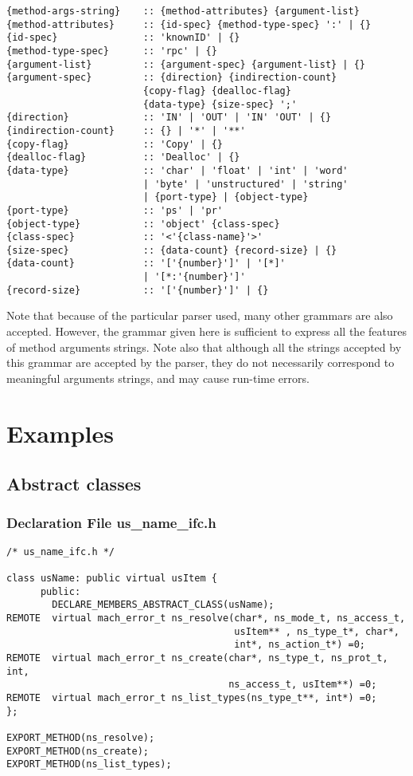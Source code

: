 \begin{verbatim}
{method-args-string}    :: {method-attributes} {argument-list}
{method-attributes}     :: {id-spec} {method-type-spec} ':' | {}
{id-spec}               :: 'knownID' | {}
{method-type-spec}      :: 'rpc' | {}
{argument-list}         :: {argument-spec} {argument-list} | {}
{argument-spec}         :: {direction} {indirection-count}
                        {copy-flag} {dealloc-flag}
                        {data-type} {size-spec} ';'
{direction}             :: 'IN' | 'OUT' | 'IN' 'OUT' | {}
{indirection-count}     :: {} | '*' | '**'
{copy-flag}             :: 'Copy' | {}
{dealloc-flag}          :: 'Dealloc' | {}
{data-type}             :: 'char' | 'float' | 'int' | 'word'
                        | 'byte' | 'unstructured' | 'string'
                        | {port-type} | {object-type}
{port-type}             :: 'ps' | 'pr'
{object-type}           :: 'object' {class-spec}
{class-spec}            :: '<'{class-name}'>'
{size-spec}             :: {data-count} {record-size} | {}
{data-count}            :: '['{number}']' | '[*]'
                        | '[*:'{number}']'
{record-size}           :: '['{number}']' | {}
\end{verbatim}

Note that because of the particular parser used, many other grammars
are also accepted. However, the grammar given here is sufficient to
express all the features of method arguments strings. Note also that
although all the strings accepted by this grammar are accepted by the
parser, they do not necessarily correspond to meaningful arguments
strings, and may cause run-time errors.

\section{Examples}

\subsection{Abstract classes}
\subsubsection{Declaration File us\_name\_ifc.h}

{\footnotesize
\begin{verbatim}
/* us_name_ifc.h */

class usName: public virtual usItem {
      public:
        DECLARE_MEMBERS_ABSTRACT_CLASS(usName);
REMOTE  virtual mach_error_t ns_resolve(char*, ns_mode_t, ns_access_t, 
                                        usItem** , ns_type_t*, char*, 
                                        int*, ns_action_t*) =0;
REMOTE  virtual mach_error_t ns_create(char*, ns_type_t, ns_prot_t, int,
                                       ns_access_t, usItem**) =0;
REMOTE  virtual mach_error_t ns_list_types(ns_type_t**, int*) =0;
};

EXPORT_METHOD(ns_resolve);
EXPORT_METHOD(ns_create);
EXPORT_METHOD(ns_list_types);
\end{verbatim}
}

